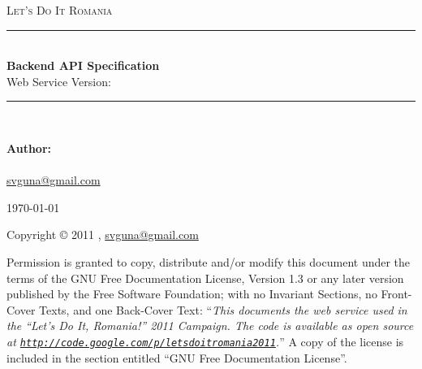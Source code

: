 \begin{titlepage}
\begin{center}
\newcommand{\HRule}{\rule{\linewidth}{0.5mm}}

\textsc{\LARGE Let's Do It Romania}\\[7cm]

\HRule\\[.5cm]
{\huge \bfseries Backend API Specification}\\[.5cm]
{\Large Web Service Version: \version}\\[.3cm]
\HRule\\[8cm]

\begin{flushleft}
{\large
\textbf{Author:}\\
\stef\\
\href{mailto:svguna@gmail.com}{svguna@gmail.com}
}
\end{flushleft}

\vfill
{\large \today}

\end{center}
\end{titlepage}

\begin{center}
\begin{minipage}[t]{.9\textwidth}
  Copyright \copyright{} 2011 \stef,
  \href{mailto:svguna@gmail.com}{svguna@gmail.com}

\bigskip
Permission is granted to copy, distribute and/or modify this document under the
terms of the GNU Free Documentation License, Version 1.3 or any later version
published by the Free Software Foundation; with no Invariant Sections, no
Front-Cover Texts, and one Back-Cover Text: ``\emph{This documents the web
service used in the ``Let's Do It, Romania!'' 2011 Campaign. The code is
available as open source at
\href{http://code.google.com/p/letsdoitromania2011/}{\texttt{http://code.google.com/p/letsdoitromania2011}}.}''
A copy of the license is included in the section entitled ``GNU Free
Documentation License''.
\end{minipage}

\end{center}

\vfill

\thispagestyle{empty}
\clearpage
\setcounter{page}{1}


